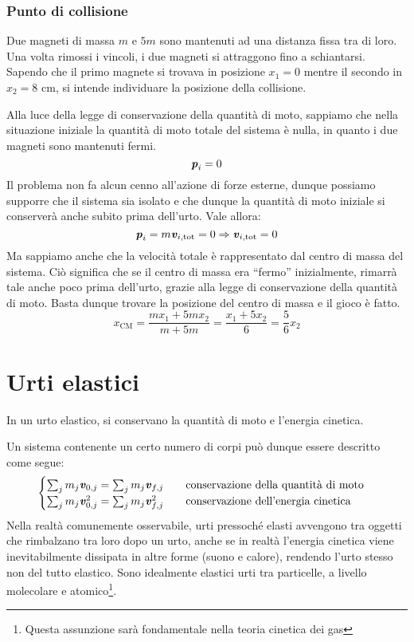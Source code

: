 \subsubsection*{Punto di collisione}
Due magneti di massa $m$ e $5m$ sono mantenuti ad una distanza fissa tra
di loro. Una volta rimossi i vincoli, i due magneti si attraggono fino a
schiantarsi. Sapendo che il primo magnete si trovava in posizione $x_1 = 0$
mentre il secondo in $x_2 = 8\text{ cm}$, si intende individuare la posizione
della collisione.

Alla luce della legge di conservazione della quantità di moto, sappiamo
che nella situazione iniziale la quantità di moto totale del sistema è
nulla, in quanto i due magneti sono mantenuti fermi.
\[ \textbf{\textit{p}}_i = 0 \]
Il problema non fa alcun cenno all'azione di forze esterne, dunque possiamo
supporre che il sistema sia isolato e che dunque la quantità di moto
iniziale si conserverà anche subito prima dell'urto. Vale allora:
\[ \textbf{\textit{p}}_i = m\textbf{\textit{v}}_{i,\text{tot}} = 0 \Rightarrow \textbf{\textit{v}}_{i,\text{tot}} = 0 \]
Ma sappiamo anche che la velocità totale è rappresentato dal centro di massa
del sistema. Ciò significa che se il centro di massa era ``fermo''
inizialmente, rimarrà tale anche poco prima dell'urto, grazie alla legge
di conservazione della quantità di moto. Basta dunque trovare la posizione
del centro di massa e il gioco è fatto.
\[ x_\text{CM} = \frac{mx_1 + 5mx_2}{m + 5m} = \frac{x_1 + 5x_2}{6} = \frac{5}{6}x_2 \]


\section{Urti elastici}
\begin{tcolorbox}[colback = yellow!30, colframe = yellow!30!black, title = {Urto elastico}]
    In un urto elastico, si conservano la quantità di moto e l'energia cinetica.
\end{tcolorbox}
\vspace{5pt}

\noindent Un sistema contenente un certo numero di corpi può dunque essere descritto come segue:
\begin{align}
    \begin{cases}
        \sum_j m_j\textbf{\textit{v}}_{0,j} = \sum_j m_j\textbf{\textit{v}}_{f,j} \qquad \text{conservazione della quantità di moto}\\
        \sum_j m_j\textbf{\textit{v}}_{0,j}^2 = \sum_j m_j\textbf{\textit{v}}_{f,j}^2 \qquad \text{conservazione dell'energia cinetica}
    \end{cases}
\end{align}
Nella realtà comunemente osservabile, urti pressoché elasti avvengono tra
oggetti che rimbalzano tra loro dopo un urto, anche se in realtà l'energia
cinetica viene inevitabilmente dissipata in altre forme (suono e calore), rendendo
l'urto stesso non del tutto elastico. Sono idealmente elastici urti tra
particelle, a livello molecolare e atomico\footnote{Questa assunzione sarà fondamentale
nella teoria cinetica dei gas}.

